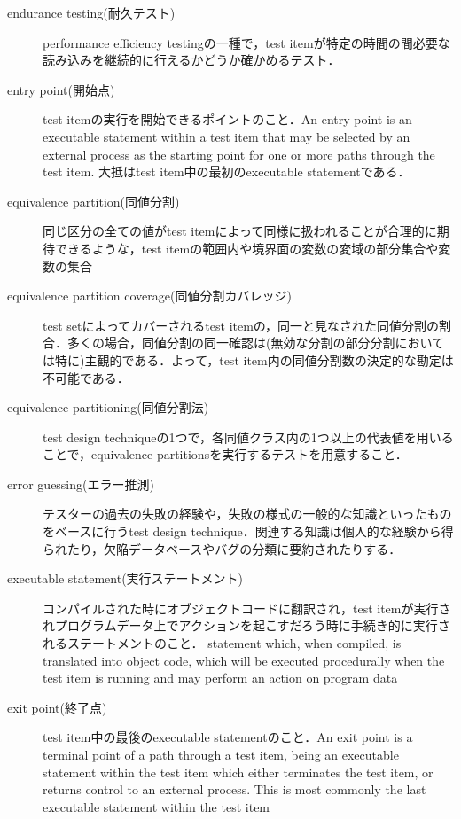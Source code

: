 \begin{description}
    \item[endurance testing(耐久テスト)]performance efficiency testingの一種で，test itemが特定の時間の間必要な読み込みを継続的に行えるかどうか確かめるテスト．
    \item[entry point(開始点)]test itemの実行を開始できるポイントのこと．An entry point is an executable statement within a test item that may be selected by an external process as the starting point for one or more paths through the test item. 大抵はtest item中の最初のexecutable statementである．
    \item[equivalence partition(同値分割)]同じ区分の全ての値がtest itemによって同様に扱われることが合理的に期待できるような，test itemの範囲内や境界面の変数の変域の部分集合や変数の集合
    \item[equivalence partition coverage(同値分割カバレッジ)]test setによってカバーされるtest itemの，同一と見なされた同値分割の割合．多くの場合，同値分割の同一確認は(無効な分割の部分分割においては特に)主観的である．よって，test item内の同値分割数の決定的な勘定は不可能である．
    \item[equivalence partitioning(同値分割法)]test design techniqueの1つで，各同値クラス内の1つ以上の代表値を用いることで，equivalence partitionsを実行するテストを用意すること．
    \item[error guessing(エラー推測)]テスターの過去の失敗の経験や，失敗の様式の一般的な知識といったものをベースに行うtest design technique．関連する知識は個人的な経験から得られたり，欠陥データベースやバグの分類に要約されたりする．
    \item[executable statement(実行ステートメント)]コンパイルされた時にオブジェクトコードに翻訳され，test itemが実行されプログラムデータ上でアクションを起こすだろう時に手続き的に実行されるステートメントのこと．
        statement which, when compiled, is translated into object code, which will be executed procedurally when the test item is running and may perform an action on program data
    \item[exit point(終了点)]test item中の最後のexecutable statementのこと．An exit point is a terminal point of a path through a test item, being an executable statement within the test item which either terminates the test item, or returns control to an external process. This is most commonly the last executable statement within the test item

\end{description}
